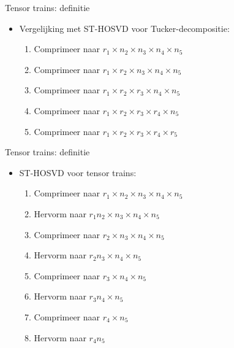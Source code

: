 \documentclass[t,12pt,dutch
\ifx\beamermode\undefined\else,\beamermode\fi
]{beamer}
\begin{document}
\begin{frame}{Tensor trains: definitie}

\begin{itemize}
\item Vergelijking met ST-HOSVD voor Tucker-decompositie:
\begin{enumerate}
\item Comprimeer naar $r_1 \times n_2 \times n_3 \times n_4 \times n_5$
\item Comprimeer naar $r_1 \times r_2 \times n_3 \times n_4 \times n_5$
\item Comprimeer naar $r_1 \times r_2 \times r_3 \times n_4 \times n_5$
\item Comprimeer naar $r_1 \times r_2 \times r_3 \times r_4 \times n_5$
\item Comprimeer naar $r_1 \times r_2 \times r_3 \times r_4 \times r_5$
\end{enumerate}
\end{itemize}

\end{frame}

\begin{frame}{Tensor trains: definitie}

\begin{itemize}
\item ST-HOSVD voor tensor trains:
\begin{enumerate}
\item Comprimeer naar $r_1 \times n_2 \times n_3 \times n_4 \times n_5$
\item Hervorm naar $r_1 n_2 \times n_3 \times n_4 \times n_5$
\item Comprimeer naar $r_2 \times n_3 \times n_4 \times n_5$
\item Hervorm naar $r_2 n_3 \times n_4 \times n_5$
\item Comprimeer naar $r_3 \times n_4 \times n_5$
\item Hervorm naar $r_3 n_4 \times n_5$
\item Comprimeer naar $r_4 \times n_5$
\item Hervorm naar $r_4 n_5$
\end{enumerate}
\end{itemize}

\end{frame}
\end{document}

